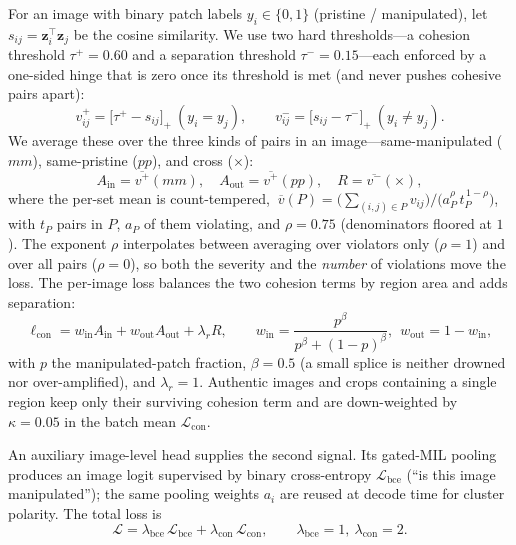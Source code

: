 For an image with binary patch labels $y_i\in\{0,1\}$ (pristine / manipulated),
let $s_{ij}=\mathbf{z}_i^{\top}\mathbf{z}_j$ be the cosine similarity. We use two
hard thresholds---a cohesion threshold $\tau^{+}{=}0.60$ and a separation
threshold $\tau^{-}{=}0.15$---each enforced by a one-sided hinge that is zero
once its threshold is met (and never pushes cohesive pairs apart):
\begin{equation}
  v^{+}_{ij}=\big[\tau^{+}-s_{ij}\big]_{+}\ (y_i{=}y_j),
  \qquad
  v^{-}_{ij}=\big[s_{ij}-\tau^{-}\big]_{+}\ (y_i{\neq}y_j).
\end{equation}
We average these over the three kinds of pairs in an image---same-manipulated
($mm$), same-pristine ($pp$), and cross ($\times$):
\begin{equation}
  A_{\text{in}}=\overline{v^{+}}(mm),\quad
  A_{\text{out}}=\overline{v^{+}}(pp),\quad
  R=\overline{v^{-}}(\times),
\end{equation}
where the per-set mean is count-tempered,
$\ \overline{v}(P)=\big(\textstyle\sum_{(i,j)\in P} v_{ij}\big)\big/\big(a_P^{\rho}\,t_P^{\,1-\rho}\big)$,
with $t_P$ pairs in $P$, $a_P$ of them violating, and $\rho{=}0.75$ (denominators
floored at $1$). The exponent $\rho$ interpolates between averaging over
violators only ($\rho{=}1$) and over all pairs ($\rho{=}0$), so both the severity
and the \emph{number} of violations move the loss. The per-image loss balances
the two cohesion terms by region area and adds separation:
\begin{equation}
  \ell_{\text{con}}=w_{\text{in}}A_{\text{in}}+w_{\text{out}}A_{\text{out}}+\lambda_{r}R,
  \qquad
  w_{\text{in}}=\frac{p^{\beta}}{p^{\beta}+(1-p)^{\beta}},\ \ w_{\text{out}}{=}1{-}w_{\text{in}},
\end{equation}
with $p$ the manipulated-patch fraction, $\beta{=}0.5$ (a small splice is neither
drowned nor over-amplified), and $\lambda_{r}{=}1$. Authentic images and crops
containing a single region keep only their surviving cohesion term and are
down-weighted by $\kappa{=}0.05$ in the batch mean $\mathcal{L}_{\text{con}}$.

An auxiliary image-level head supplies the second signal. Its gated-MIL pooling
produces an image logit supervised by binary cross-entropy
$\mathcal{L}_{\text{bce}}$ (``is this image manipulated''); the same pooling
weights $a_i$ are reused at decode time for cluster polarity. The total loss is
\begin{equation}
  \mathcal{L}
  = \lambda_{\text{bce}}\,\mathcal{L}_{\text{bce}}
  + \lambda_{\text{con}}\,\mathcal{L}_{\text{con}},
  \qquad \lambda_{\text{bce}}{=}1,\ \lambda_{\text{con}}{=}2 .
\end{equation}

